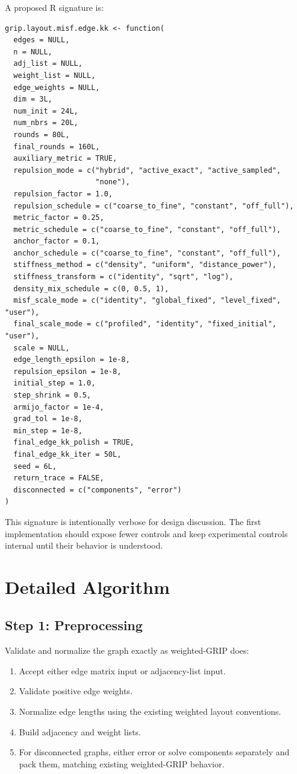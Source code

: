\documentclass[11pt]{article}
\begin{document}
A proposed R signature is:
\begin{verbatim}
grip.layout.misf.edge.kk <- function(
  edges = NULL,
  n = NULL,
  adj_list = NULL,
  weight_list = NULL,
  edge_weights = NULL,
  dim = 3L,
  num_init = 24L,
  num_nbrs = 20L,
  rounds = 80L,
  final_rounds = 160L,
  auxiliary_metric = TRUE,
  repulsion_mode = c("hybrid", "active_exact", "active_sampled",
                     "none"),
  repulsion_factor = 1.0,
  repulsion_schedule = c("coarse_to_fine", "constant", "off_full"),
  metric_factor = 0.25,
  metric_schedule = c("coarse_to_fine", "constant", "off_full"),
  anchor_factor = 0.1,
  anchor_schedule = c("coarse_to_fine", "constant", "off_full"),
  stiffness_method = c("density", "uniform", "distance_power"),
  stiffness_transform = c("identity", "sqrt", "log"),
  density_mix_schedule = c(0, 0.5, 1),
  misf_scale_mode = c("identity", "global_fixed", "level_fixed", "user"),
  final_scale_mode = c("profiled", "identity", "fixed_initial", "user"),
  scale = NULL,
  edge_length_epsilon = 1e-8,
  repulsion_epsilon = 1e-8,
  initial_step = 1.0,
  step_shrink = 0.5,
  armijo_factor = 1e-4,
  grad_tol = 1e-8,
  min_step = 1e-8,
  final_edge_kk_polish = TRUE,
  final_edge_kk_iter = 50L,
  seed = 6L,
  return_trace = FALSE,
  disconnected = c("components", "error")
)
\end{verbatim}

This signature is intentionally verbose for design discussion. The first
implementation should expose fewer controls and keep experimental controls
internal until their behavior is understood.

\section{Detailed Algorithm}

\subsection{Step 1: Preprocessing}

Validate and normalize the graph exactly as weighted-GRIP does:
\begin{enumerate}[leftmargin=2em]
  \item Accept either edge matrix input or adjacency-list input.
  \item Validate positive edge weights.
  \item Normalize edge lengths using the existing weighted layout conventions.
  \item Build adjacency and weight lists.
  \item For disconnected graphs, either error or solve components separately
  and pack them, matching existing weighted-GRIP behavior.
\end{enumerate}
\end{document}
